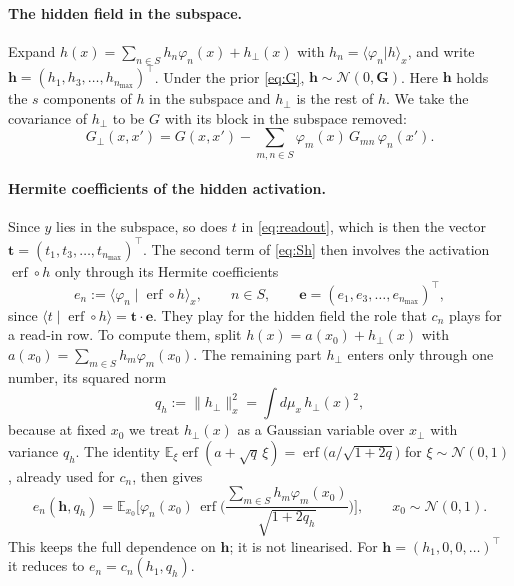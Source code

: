 \documentclass[11pt,a4paper]{article}
\newcommand{\E}{\mathbb{E}}
\newcommand{\erf}{\operatorname{erf}}
\begin{document}
\paragraph{The hidden field in the subspace.}
Expand $h(x)=\sum_{n\in S}h_n\varphi_n(x)+h_\perp(x)$ with $h_n=\langle\varphi_n|h\rangle_x$, and write
$\mathbf h=(h_1,h_3,\dots,h_{n_{\max}})^\top$.
Under the prior \eqref{eq:G}, $\mathbf h\sim\mathcal N(0,\mathbf G)$.
Here $\mathbf h$ holds the $s$ components of $h$ in the subspace and $h_\perp$ is the rest of $h$.
We take the covariance of $h_\perp$ to be $G$ with its block in the subspace removed:
\begin{equation}
  G_\perp(x,x')=G(x,x')-\sum_{m,n\in S}\varphi_m(x)\,G_{mn}\,\varphi_n(x').
  \label{eq:Gperp}
\end{equation}
\paragraph{Hermite coefficients of the hidden activation.}
Since $y$ lies in the subspace, so does $t$ in \eqref{eq:readout}, which is then the vector $\mathbf t=(t_1,t_3,\dots,t_{n_{\max}})^\top$.
The second term of \eqref{eq:Sh} then involves the activation $\erf\circ h$ only through its Hermite coefficients
\begin{equation*}
  e_n:=\langle\varphi_n\mid\erf\circ h\rangle_x,\qquad n\in S,\qquad
  \mathbf e=(e_1,e_3,\dots,e_{n_{\max}})^\top,
\end{equation*}
since $\langle t\mid\erf\circ h\rangle=\mathbf t\cdot\mathbf e$.
They play for the hidden field the role that $c_n$ plays for a read-in row.
To compute them, split $h(x)=a(x_0)+h_\perp(x)$ with $a(x_0)=\sum_{m\in S}h_m\varphi_m(x_0)$.
The remaining part $h_\perp$ enters only through one number, its squared norm
\begin{equation}
  q_h:=\|h_\perp\|_x^2=\int d\mu_x\,h_\perp(x)^2 ,
\end{equation}
because at fixed $x_0$ we treat $h_\perp(x)$ as a Gaussian variable over $x_\perp$ with variance $q_h$.
The identity $\E_\xi\erf(a+\sqrt q\,\xi)=\erf\big(a/\sqrt{1+2q}\big)$ for $\xi\sim\mathcal N(0,1)$, already used for $c_n$, then gives
\begin{equation}
  e_n(\mathbf h,q_h)
  =\E_{x_0}\!\Big[\varphi_n(x_0)\,\erf\Big(\frac{\sum_{m\in S}h_m\varphi_m(x_0)}{\sqrt{1+2q_h}}\Big)\Big],
  \qquad x_0\sim\mathcal N(0,1).
  \label{eq:Psi}
\end{equation}
This keeps the full dependence on $\mathbf h$; it is not linearised.
For $\mathbf h=(h_1,0,0,\dots)^\top$ it reduces to $e_n=c_n(h_1,q_h)$.
\end{document}
